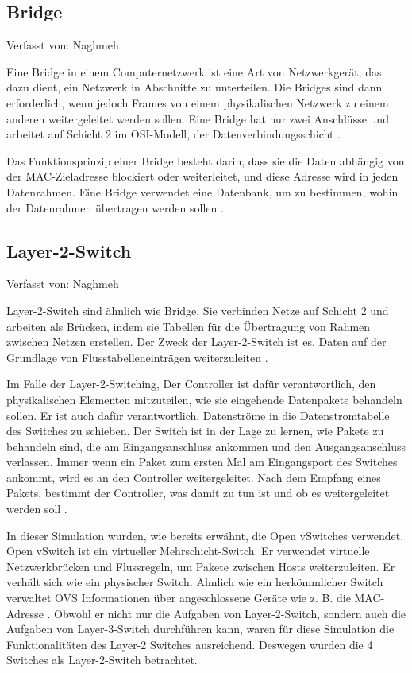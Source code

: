 \documentclass[fontsize=12pt,paper=a4,open=any,parskip=half,
  twoside=false,toc=listof,toc=bibliography,fleqn,leqno,
  captions=nooneline,captions=tableabove,british]{scrbook}
\begin{document}
\subsection{Bridge}
{\tiny Verfasst von: Naghmeh\par}
Eine Bridge in einem Computernetzwerk ist eine Art von Netzwerkgerät, das dazu dient, ein Netzwerk in Abschnitte zu unterteilen. Die Bridges sind dann erforderlich, wenn jedoch Frames von einem physikalischen Netzwerk zu einem anderen weitergeleitet werden sollen. Eine Bridge hat nur zwei Anschlüsse und  arbeitet auf Schicht 2 im OSI-Modell, der Datenverbindungsschicht \cite{baun2019grundlagen}.\par
Das Funktionsprinzip einer Bridge besteht darin, dass sie die Daten abhängig von der MAC-Zieladresse blockiert oder weiterleitet, und diese Adresse wird in jeden Datenrahmen. Eine Bridge verwendet eine Datenbank, um zu bestimmen, wohin der Datenrahmen übertragen werden sollen \cite{networkdevices}.
\newpage
\subsection{Layer-2-Switch}
{\tiny Verfasst von: Naghmeh\par}
Layer-2-Switch sind ähnlich wie Bridge. Sie verbinden Netze auf Schicht 2 und arbeiten als Brücken, indem sie Tabellen für die Übertragung von Rahmen zwischen Netzen erstellen. Der Zweck der Layer-2-Switch ist es, Daten auf der Grundlage von Flusstabelleneinträgen weiterzuleiten \cite{networkdevices}.\par
Im Falle der Layer-2-Switching, Der Controller ist dafür verantwortlich, den physikalischen Elementen mitzuteilen, wie sie eingehende Datenpakete behandeln sollen. Er ist auch dafür verantwortlich, Datenströme in die Datenstromtabelle des Switches zu schieben. Der Switch ist in der Lage zu lernen, wie Pakete zu behandeln sind, die am Eingangsanschluss ankommen und den Ausgangsanschluss verlassen. Immer wenn ein Paket zum ersten Mal am Eingangsport des Switches ankommt, wird es an den Controller weitergeleitet. Nach dem Empfang eines Pakets, bestimmt der Controller, was damit zu tun ist und ob es weitergeleitet werden soll \cite{7840116}.\par
In dieser Simulation wurden, wie bereits erwähnt, die Open vSwitches verwendet. Open vSwitch ist ein virtueller Mehrschicht-Switch. Er verwendet virtuelle Netzwerkbrücken und Flussregeln, um Pakete zwischen Hosts weiterzuleiten. Er verhält sich wie ein physischer Switch. Ähnlich wie ein herkömmlicher Switch verwaltet OVS Informationen über angeschlossene Geräte wie z. B. die MAC-Adresse \cite{openvswitch1}. Obwohl er nicht nur die Aufgaben von Layer-2-Switch, sondern auch die Aufgaben von Layer-3-Switch durchführen kann, waren für diese Simulation die Funktionalitäten  des Layer-2 Switches ausreichend. Deswegen wurden die 4 Switches als Layer-2-Switch betrachtet.
\end{document}
